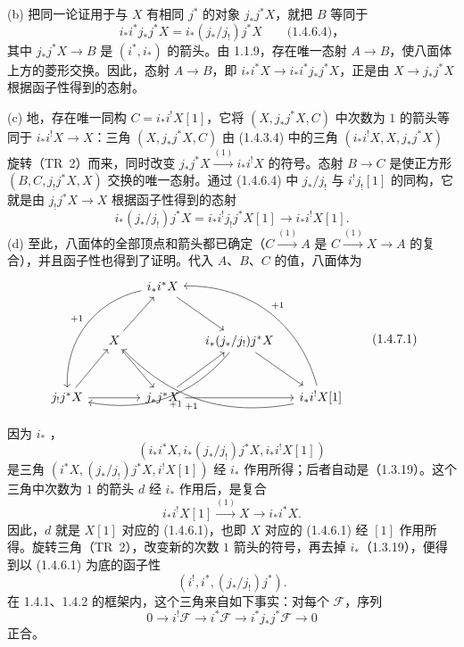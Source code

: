 (b) 把同一论证用于与 $X$ 有相同 $j^*$ 的对象 $j_*j^*X$，就把 $B$ 等同于
\[
i_*i^*j_*j^*X=i_*(j_*/j_!)j^*X\qquad\text{(1.4.6.4)，}
\]
其中 $j_*j^*X\to B$ 是 $(i^*,i_*)$ 的箭头。由 1.1.9，存在唯一态射 $A\to B$，使八面体上方的菱形交换。因此，态射 $A\to B$，即 $i_*i^*X\to i_*i^*j_*j^*X$，正是由 $X\to j_*j^*X$ 根据函子性得到的态射。

(c) 地，存在唯一同构 $C=i_*i^!X[1]$，它将 $(X,j_*j^*X,C)$ 中次数为 $1$ 的箭头等同于 $i_*i^!X\to X$：三角 $(X,j_*j^*X,C)$ 由 (1.4.3.4) 中的三角 $(i_*i^!X,X,j_*j^*X)$ 旋转（TR~2）而来，同时改变 $j_*j^*X\xrightarrow{(1)}i_*i^!X$ 的符号。态射 $B\to C$ 是使正方形 $(B,C,j_!j^*X,X)$ 交换的唯一态射。通过 (1.4.6.4) 中 $j_*/j_!$ 与 $i^!j_![1]$ 的同构，它就是由 $j_!j^*X\to X$ 根据函子性得到的态射
\[
i_*(j_*/j_!)j^*X=i_*i^!j_!j^*X[1]\longrightarrow i_*i^!X[1].
\]
(d) 至此，八面体的全部顶点和箭头都已确定（$C\xrightarrow{(1)}A$ 是 $C\xrightarrow{(1)}X\to A$ 的复合），并且函子性也得到了证明。代入 $A$、$B$、$C$ 的值，八面体为
\begin{equation*}
\begin{tikzcd}[ampersand replacement=\&,column sep=small,row sep=large]
\&\&i_*i^*X\arrow[dr]\arrow[ddll,bend right=40,"{+1}"']\&\&\\
\&X\arrow[ur]\arrow[dr]\&\&i_*(j_*/j_!)j^*X\arrow[dr]\arrow[dlll,bend left=30,"{+1}"]\&\\
j_!j^*X\arrow[ur]\arrow[rr]\&\&j_*j^*X\arrow[ur]\arrow[rr]\&\&i_*i^!X[1]\arrow[ulll,bend left=28,"{+1}"]\arrow[uull,bend right=38,"{+1}"']
\end{tikzcd}\tag{1.4.7.1}
\end{equation*}
因为 $i_*$ ，
\[
(i_*i^*X,i_*(j_*/j_!)j^*X,i_*i^!X[1])
\]
是三角 $(i^*X,(j_*/j_!)j^*X,i^!X[1])$ 经 $i_*$ 作用所得；后者自动是（1.3.19）。这个三角中次数为 $1$ 的箭头 $d$ 经 $i_*$ 作用后，是复合
\[
i_*i^!X[1]\xrightarrow{(1)}X\longrightarrow i_*i^*X.
\]
因此，$d$ 就是 $X[1]$ 对应的 (1.4.6.1)，也即 $X$ 对应的 (1.4.6.1) 经 $[1]$ 作用所得。旋转三角（TR~2），改变新的次数 $1$ 箭头的符号，再去掉 $i_*$（1.3.19），便得到以 (1.4.6.1) 为底的函子性
\begin{equation*}
(i^!,i^*,(j_*/j_!)j^*).\tag{1.4.7.2}
\end{equation*}
在 1.4.1、1.4.2 的框架内，这个三角来自如下事实：对每个 $\mathcal F$，序列
\[
0\longrightarrow i^!\mathcal F\longrightarrow i^*\mathcal F
 \longrightarrow i^*j_*j^*\mathcal F\longrightarrow0
\]
正合。

